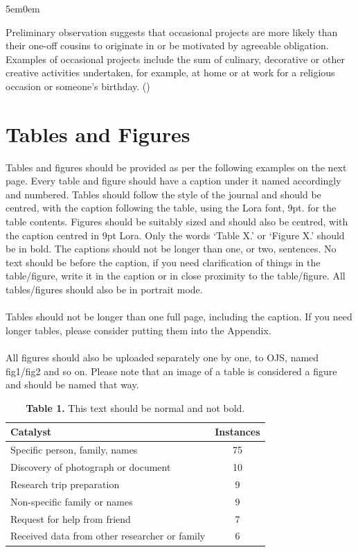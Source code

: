 \documentclass[12pt]{article}
\newenvironment{blockquote}
  {%
    \vspace{1em}%
    \begin{adjustwidth}{5em}{0em}%
    \justifying%
    \setlength{\parindent}{0pt}%
    \normalsize%
  }
  {%
    \end{adjustwidth}%
    \vspace{1em}%
  }
\begin{document}
\begin{blockquote}
Preliminary observation suggests that occasional projects are more likely than their one-off cousins to originate in or be motivated by agreeable obligation. Examples of occasional projects include the sum of culinary, decorative or other creative activities undertaken, for example, at home or at work for a religious occasion or someone’s birthday. (\cite{acuna2012hci})
\end{blockquote}

\section{Tables and Figures}

Tables and figures should be provided as per the following examples on the next page. Every table and figure should have a caption under it named accordingly and numbered. Tables should follow the style of the journal and should be centred, with the caption following the table, using the Lora font, 9pt. for the table contents. Figures should be suitably sized and should also be centred, with the caption centred in 9pt Lora. Only the words ‘Table X.’ or ‘Figure X.’ should be in bold. The captions should not be longer than one, or two, sentences. No text should be before the caption, if you need clarification of things in the table/figure, write it in the caption or in close proximity to the table/figure. All tables/figures should also be in portrait mode.\\\\
Tables should not be longer than one full page, including the caption. If you need longer tables, please consider putting them into the Appendix.\\\\
All figures should also be uploaded separately one by one, to OJS, named fig1/fig2 and so on. Please note that an image of a table is considered a figure and should be named that way.

\begin{table}[h!]
\begin{tabular}{|l|c|}
\hline
\rowcolor{black}
\color{white} Catalyst & \color{white} Instances \\
\hline
Specific person, family, names & 75 \\ \hline
Discovery of photograph or document & 10 \\ \hline
Research trip preparation & 9 \\ \hline
Non-specific family or names & 9 \\ \hline
Request for help from friend & 7 \\ \hline
Received data from other researcher or family & 6 \\ \hline
\end{tabular}
\centering
\caption*{\textbf{Table 1.} This text should be normal and not bold.}
\end{table}
\end{document}
